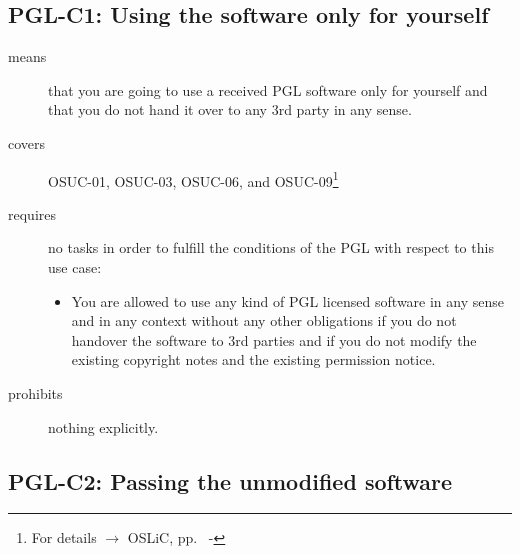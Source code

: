 
\subsection{PGL-C1: Using the software only for yourself}
\label{OSUC-01-PGL} 
\label{OSUC-03-PGL} 
\label{OSUC-06-PGL}
\label{OSUC-09-PGL}
  
\begin{description}

\item[means] that you are going to use a received PGL software only for yourself
and that you do not hand it over to any 3rd party in any sense.

\item[covers] OSUC-01, OSUC-03, OSUC-06, and OSUC-09\footnote{For details
$\rightarrow$ OSLiC, pp.\ \pageref{OSUC-01-DEF} - \pageref{OSUC-09-DEF}}

\item[requires] no tasks in order to fulfill the conditions of the PGL with
respect to this use case:
  \begin{itemize}
    \item You are allowed to use any kind of PGL licensed software in any sense
    and in any context without any other obligations if you do not handover the
    software to 3rd parties and if you do not modify the existing copyright
    notes and the existing permission notice.
  \end{itemize}

\item[prohibits] nothing explicitly.

\end{description}

\subsection{PGL-C2: Passing the unmodified software}
\label{OSUC-02S-PGL} \label{OSUC-05S-PGL} \label{OSUC-07S-PGL} 
\label{OSUC-02B-PGL} \label{OSUC-05B-PGL} \label{OSUC-07B-PGL} 

